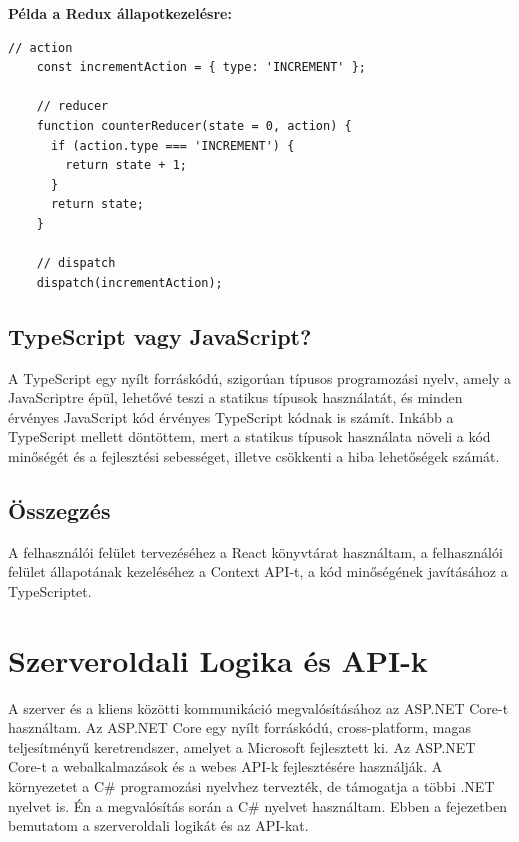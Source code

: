 \newpage
\textbf{Példa a Redux állapotkezelésre:}
\begin{lstlisting}[style=es6, morekeywords={document, P5, katex}]
    // action
    const incrementAction = { type: 'INCREMENT' };
    
    // reducer
    function counterReducer(state = 0, action) {
      if (action.type === 'INCREMENT') {
        return state + 1;
      }
      return state;
    }
    
    // dispatch
    dispatch(incrementAction);
\end{lstlisting}

\subsection*{TypeScript vagy JavaScript?}
A TypeScript egy nyílt forráskódú, szigorúan típusos programozási nyelv,
amely a JavaScriptre épül, lehetővé teszi a statikus típusok használatát,
és minden érvényes JavaScript kód érvényes TypeScript kódnak is számít.
Inkább a TypeScript mellett döntöttem, mert a statikus típusok használata
növeli a kód minőségét és a fejlesztési sebességet, illetve csökkenti a hiba lehetőségek számát.

\subsection*{Összegzés}
A felhasználói felület tervezéséhez a React könyvtárat használtam,
a felhasználói felület állapotának kezeléséhez a Context API-t,
a kód minőségének javításához a TypeScriptet.
\newpage
\section{Szerveroldali Logika és API-k}
A szerver és a kliens közötti kommunikáció megvalósításához az ASP.NET Core-t használtam.
Az ASP.NET Core egy nyílt forráskódú, cross-platform, magas teljesítményű keretrendszer,
amelyet a Microsoft fejlesztett ki.
Az ASP.NET Core-t a webalkalmazások és a webes API-k fejlesztésére használják.
A környezetet a C\# programozási nyelvhez tervezték, de támogatja a többi .NET nyelvet is.
Én a megvalósítás során a C\# nyelvet használtam.
Ebben a fejezetben bemutatom a szerveroldali logikát és az API-kat.


